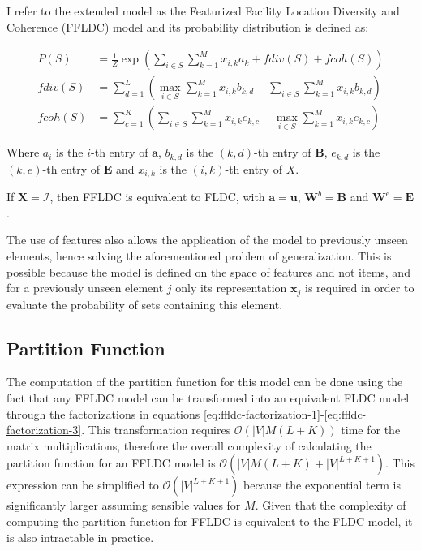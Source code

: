 I refer to the extended model as the Featurized Facility Location Diversity and Coherence (FFLDC) model and its probability distribution is defined as:

\begin{align}
  \tag{FFLDC} \label{eq:ffldc}
  P(S) &= \frac{1}{Z}\exp{\left(\sum_{i \in S}{\sum_{k=1}^{M}x_{i,k}a_{k}} + fdiv(S) + fcoh(S)\right)} \\
  fdiv(S) &= \sum_{d=1}^{L}{\left(\max_{i \in S}{\sum_{k=1}^{M}x_{i,k}b_{k,d}} - \sum_{i \in S}{\sum_{k=1}^{M}x_{i,k}b_{k,d}}\right)} \\
  fcoh(S) &= \sum_{c=1}^{K}{\left(\sum_{i \in S}{\sum_{k=1}^{M}x_{i,k}e_{k,c}} - \max_{i \in S}{\sum_{k=1}^{M}x_{i,k}e_{k,c}}\right)}
\end{align}

Where $a_{i}$ is the $i$-th entry of $\mathbf{a}$, $b_{k,d}$ is the $(k,d)$-th entry of $\mathbf{B}$, $e_{k,d}$ is the $(k,e)$-th entry of $\mathbf{E}$ and $x_{i,k}$ is the $(i,k)$-th entry of $X$.

\begin{remark}
  If $\mathbf{X} = \mathcal{I}$, then FFLDC is equivalent to FLDC, with $\mathbf{a} = \mathbf{u}$, $\mathbf{W}^{b} = \mathbf{B}$ and $\mathbf{W}^{e} = \mathbf{E}$.
\end{remark}

The use of features also allows the application of the model to previously unseen elements, hence solving the aforementioned problem of generalization. This is possible because the model is defined on the space of features and not items, and for a previously unseen element $j$ only its representation $\mathbf{x}_{j}$ is required in order to evaluate the probability of sets containing this element.

\subsection{Partition Function}

The computation of the partition function for this model can be done using the fact that any FFLDC model can be transformed into an equivalent FLDC model through the factorizations in equations \eqref{eq:ffldc-factorization-1}-\eqref{eq:ffldc-factorization-3}. This transformation requires $\mathcal{O}(|V|M(L+K))$ time for the matrix multiplications, therefore the overall complexity of calculating the partition function for an FFLDC model is $\mathcal{O}(|V|M(L+K) + |V|^{L+K+1})$. This expression can be simplified to $\mathcal{O}(|V|^{L+K+1})$ because the exponential term is significantly larger assuming sensible values for $M$. Given that the complexity of computing the partition function for FFLDC is equivalent to the FLDC model, it is also intractable in practice.

